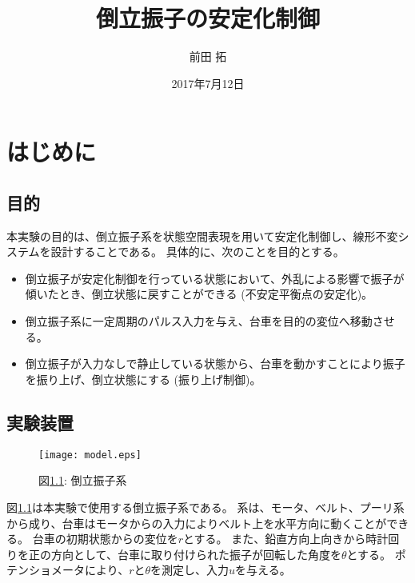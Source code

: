 \documentclass[a4j,11pt,twoside]{jbook}
\begin{document}
\title{倒立振子の安定化制御}
\author{前田 拓}
\date{2017年7月12日}
\maketitle

\tableofcontents
\listoffigures
\listoftables
{}


\chapter{はじめに}
\section{目的}
本実験の目的は、倒立振子系を状態空間表現を用いて安定化制御し、線形不変システムを設計することである。
具体的に、次のことを目的とする。

\begin{itemize}
    \renewcommand{\labelenumi}{(\roman{enumi})}
    \item 倒立振子が安定化制御を行っている状態において、外乱による影響で振子が傾いたとき、倒立状態に戻すことができる (不安定平衡点の安定化)。
    \item 倒立振子系に一定周期のパルス入力を与え、台車を目的の変位へ移動させる。
    \item 倒立振子が入力なしで静止している状態から、台車を動かすことにより振子を振り上げ、倒立状態にする (振り上げ制御)。
\end{itemize}

\section{実験装置}

\begin{figure}[htbp]
    \begin{center}
        \texttt{[image: model.eps]}
        \caption{図\ref{pendulum}: 倒立振子系}
        \label{pendulum}
    \end{center}
\end{figure}

図\ref{pendulum}は本実験で使用する倒立振子系である。
系は、モータ、ベルト、プーリ系から成り、台車はモータからの入力によりベルト上を水平方向に動くことができる。
台車の初期状態からの変位を$r$とする。
また、鉛直方向上向きから時計回りを正の方向として、台車に取り付けられた振子が回転した角度を$\theta$とする。
ポテンショメータにより、$r$と$\theta$を測定し、入力$u$を与える。
\end{document}
